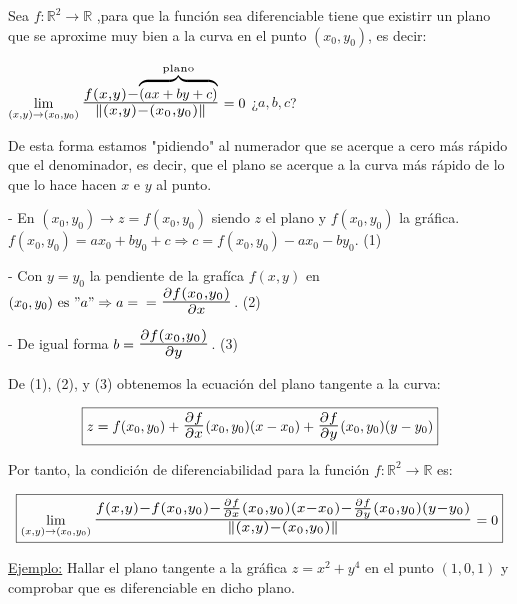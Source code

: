 \documentclass[10pt, titlepage]{article}
\newcommand{\R}{\mathbb{R}}
\newcommand{\bfrac}[2]{\scalebox{1.4}{$\frac{#1}{#2}$}}
\begin{document}
Sea $f : \R^2 \to \R$ ,para que la función sea diferenciable tiene que existirr un plano que se aproxime muy 
bien a la curva en el punto $(x_0, y_0)$, es decir:
\vspace{3mm}

$\displaystyle \lim_{(x, y) \to (x_0, y_0)} \bfrac{f (x, y) - \overbrace{\scalebox{0.7}{$(ax +by + c)$}}
^{\text{plano}}}{\| (x, y) - (x_0, y_0)\|} = 0$ ¿$a, b, c$?
\vspace{3mm}

De esta forma estamos "pidiendo" al numerador que se acerque a cero más rápido que el denominador, es decir, que el plano se acerque a la curva más rápido de lo que lo hace hacen $x$ e $y$ al punto.
\vspace{3mm}

- En $(x_0, y_0) \rightarrow  z = f (x_0, y_0)$ siendo $z$ el plano y $f (x_0, y_0)$ la gráfica. $f (x_0, y_0) = 
a x_0 + b y_0 + c \Rightarrow c = f (x_0, y_0) - a x_0 - b y_0$. (1)
\vspace{3mm}

- Con $y = y_0$ la pendiente de la grafíca $f (x, y)$ en $(x_0, y_0) \text{ es } "a" \Rightarrow a = \\ =
\bfrac{\partial f (x_0, y_0)}{\partial x}$. (2)
\vspace{3mm}

- De igual forma $b = \bfrac{\partial f (x_0, y_0)}{\partial y}$. (3)
\vspace{3mm}

De (1), (2), y (3) obtenemos la ecuación del plano tangente a la curva:

\[
\boxed{
z = f (x_0, y_0) + \bfrac{\partial f}{\partial x} (x_0, y_0) (x - x_0) + \bfrac{\partial f}{\partial y} (x_0, y_0) 
(y - y_0)
}
\]

Por tanto, la condición de diferenciabilidad para la función $f : \R^2 \to \R$ \indent es:


\[
\boxed{
\displaystyle \lim_{(x, y) \to (x_0, y_0)} \bfrac{f (x, y) - f  (x_0, y_0) - \frac{\partial f}{\partial x} (x_0, y_0)
(x - x_0) - \frac{\partial f}{\partial y} (x_0, y_0) (y - y_0)}{\|(x, y) - (x_0, y_0)\|} = 0
}
\]
\vspace{3mm}

\underline{Ejemplo:} Hallar el plano tangente a la gráfica $z = x^2 + y^4$ en el punto $(1, 0, 1)$ y 
comprobar que es diferenciable en dicho plano.
\vspace{3mm}
\end{document}
